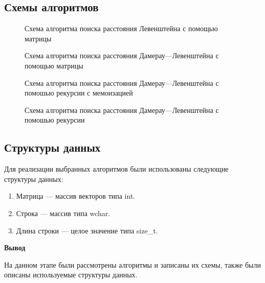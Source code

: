\subsection{Схемы алгоритмов}
\begin{figure}[H]
	\centering
	
	
	\caption{Схема алгоритма поиска расстояния Левенштейна с помощью матрицы}
	\label{fig:leb_algo_matrix}
\end{figure}

\begin{figure}[H]
	\centering
	
	
	\caption{Схема алгоритма поиска расстояния Дамерау---Левенштейна с помощью матрицы}
	\label{fig:dam_algo_matrix}
\end{figure}

\begin{figure}[H]
	\centering
	
	\caption{Схема алгоритма поиска расстояния Дамерау---Левенштейна с помошью рекурсии с мемоизацией}
	\label{fig:dam_algo_rec_mem}
\end{figure}

\begin{figure}[H]
	\centering
	
	\caption{Схема алгоритма поиска расстояния Дамерау---Левенштейна с помошью рекурсии}
	\label{fig:dam_algo_rec}
\end{figure}


\subsection{Структуры данных}
Для реализации выбранных алгоритмов были использованы следующие структуры данных:
\begin{enumerate}
	\item Матрица --- массив векторов типа int.
	\item Строка --- массив типа wchar.
	\item Длина строки --- целое значение типа size\_t.
\end{enumerate}


\textbf{Вывод}

На данном этапе были рассмотрены алгоритмы и записаны их схемы, также были описаны используемые структуры данных.







